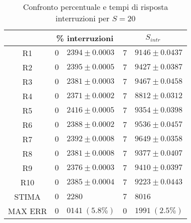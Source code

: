 \begin{table}[!h]
\begin{tabular}{c|r@{.}l|r@{.}l}
& \multicolumn{2}{|c|}{\% interruzioni}
& \multicolumn{2}{|c}{$S_{intr}$}
\\          
\hline
R1      & $0$&$2394 \pm 0.0003$ & $7$&$9146 \pm 0.0437$ \\
R2      & $0$&$2395 \pm 0.0005$ & $7$&$9427 \pm 0.0387$ \\
R3      & $0$&$2381 \pm 0.0003$ & $7$&$9467 \pm 0.0458$ \\
R4      & $0$&$2371 \pm 0.0002$ & $7$&$8812 \pm 0.0312$ \\
R5      & $0$&$2416 \pm 0.0005$ & $7$&$9354 \pm 0.0398$ \\
R6      & $0$&$2388 \pm 0.0002$ & $7$&$9536 \pm 0.0457$ \\
R7      & $0$&$2392 \pm 0.0008$ & $7$&$9649 \pm 0.0358$ \\
R8      & $0$&$2381 \pm 0.0008$ & $7$&$9377 \pm 0.0407$ \\
R9      & $0$&$2376 \pm 0.0003$ & $7$&$9410 \pm 0.0397$ \\
R10     & $0$&$2385 \pm 0.0004$ & $7$&$9223 \pm 0.0443$ \\
STIMA   & $0$&$2280$            & $7$&$8016$            \\
MAX ERR & $0$&$0141 \ (5.8\%)$    & $0$&$1991 \ (2.5\%)$    
\end{tabular}
\centering
\caption{Confronto percentuale e tempi di risposta interruzioni per $S=20$}
\label{tab:20_sintr}
\end{table}
